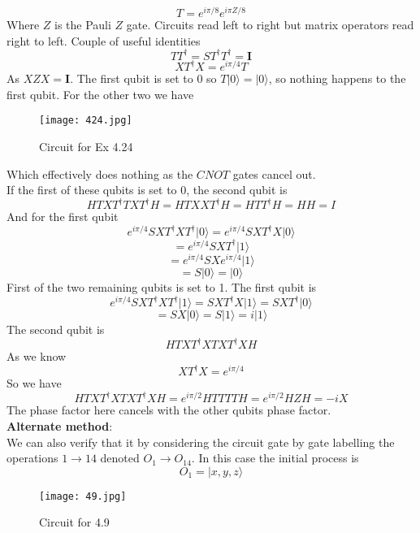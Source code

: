 \documentclass[12pt]{article}
\newcommand{\ket}[1]{\vert{#1}\rangle}
\begin{document}
\begin{enumerate}
    $$ T = e^{i \pi / 8} e^{i \pi Z /8} $$
    Where $Z$ is the Pauli $Z$ gate. Circuits read left to right but matrix operators read right to left. Couple of useful identities
    $$ T T^\dagger = ST^\dagger T^\dagger = \textbf{I} $$
    $$XT^\dagger X = e^{i \pi /4} T $$
    As $XZX = \textbf{I}$. The first qubit is set to 0 so $T \ket{0} = \ket{0}$, so nothing happens to the first qubit. For the other two we have 
    \begin{figure}[h]
        \centering
        \texttt{[image: 424.jpg]}
        \caption{Circuit for Ex 4.24}
    \end{figure}
    Which effectively does nothing as the $CNOT$ gates cancel out. \\
    If the first of these qubits is set to 0, the second qubit is 
    $$ HTXT^\dagger T X T^\dagger H = HTXXT^\dagger H = HTT^\dagger H = HH = I $$
    And for the first qubit 
    $$ e^{i \pi /4} S X T^\dagger X T^\dagger \ket{0} = e^{i \pi /4} SXT^\dagger X \ket{0} $$
    $$ = e^{i \pi /4} SXT^\dagger \ket{1} $$
    $$ = e^{i \pi /4} SX e^{i \pi /4} \ket{1} $$
    $$ = S \ket{0} = \ket{0} $$ 
    First of the two remaining qubits is set to 1. The first qubit is 
    $$ e^{i \pi /4} SXT^\dagger XT^\dagger \ket{1} = SXT^\dagger X \ket{1} = SXT^\dagger \ket{0} $$
    $$ = SX \ket{0} = S \ket{1} = i \ket{1} $$
    The second qubit is 
    $$ HTXT^\dagger XT XT^\dagger XH $$
    As we know 
    $$ XT^\dagger X = e^{i \pi /4} $$
    So we have 
    $$ HTXT^\dagger XT XT^\dagger XH = e^{i \pi /2} HTTTTH = e^{i \pi /2} HZH = -iX $$
    The phase factor here cancels with the other qubits phase factor. 
    \\
    \textbf{Alternate method}:
    \\
    We can also verify that it by considering the circuit gate by gate labelling the operations $1 \rightarrow 14$ denoted $O_1 \rightarrow O_{14}$. In this case the initial process is 
    $$ O_1 = \ket{x,y,z} $$
    \begin{figure}[h]
        \centering
        \texttt{[image: 49.jpg]}
        \caption{Circuit for 4.9}

\end{figure}
\end{enumerate}
\end{document}

